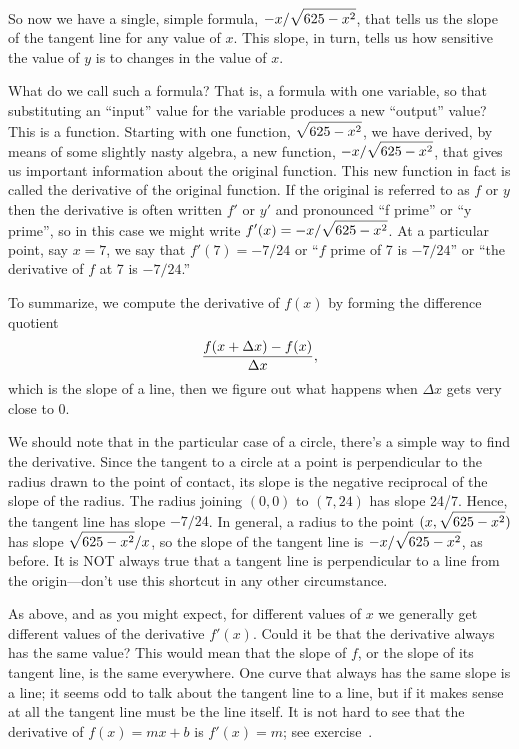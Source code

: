 So now we have a single, simple formula, $\displaystyle {-x/ \sqrt{625-x^2}}$,
that tells us the slope of the tangent line for any value of
$x$. This slope, in turn, tells us how sensitive the value of $y$ is
to changes in the value of $x$. 

What do we call such a formula? That is, a formula with one variable,
so that substituting an ``input'' value for the variable produces a
new ``output'' value? This is a function. Starting with one function,
$\displaystyle \sqrt{625-x^2}$, we have derived, by means of some slightly nasty
algebra, a new function, $\displaystyle {-x/ \sqrt{625-x^2}}$, that gives us
important information about the original function. This new function
in fact is called the {\dfont derivative} of the
original function. If the original is referred to as $f$ or $y$ then
the derivative is often written $f'$ or $y'$ and pronounced ``f
prime'' or ``y prime'', so in this case we might write $\displaystyle f'(x)=-x/
\sqrt{625-x^2}$. At a particular point, say $x=7$, we say that
$f'(7)=-7/24$ or ``$f$ prime of 7 is $-7/24$'' or ``the derivative of
$f$ at 7 is $-7/24$.''

To summarize, we compute the derivative of $f(x)$ by forming the
difference quotient
$$
{f(x+\Delta x)-f(x)\over \Delta x},
$$
which is the slope of a line, then we figure out what happens when
$\Delta x$ gets very close to 0. 


We should note that in 
the particular case of a circle, there's a simple way to find the
derivative.  Since the tangent to a circle at a point is perpendicular to
the radius drawn to the point of contact, its slope is the negative
reciprocal of the slope of the radius.  The radius joining $(0,0)$ to
$(7,24)$ has slope 24/7.  Hence, the tangent line has slope
$-7/24$. In general, a radius to the point $\displaystyle (x,\sqrt{625-x^2})$ has
slope $\displaystyle \sqrt{625-x^2}/x$, so the slope of the tangent line is
$\displaystyle {-x/ \sqrt{625-x^2}}$, as before. It is {\txtbold NOT} always true that a
tangent line is perpendicular to a line from the origin---don't use
this shortcut in any other circumstance. 

As above, and as you might expect, for different values of $x$ we
generally get different values of the derivative $f'(x)$. Could it be
that the derivative always has the same value? This would mean that
the slope of $f$, or the slope of its tangent line, is the same
everywhere. One curve that always has the same slope is a line; it
seems odd to talk about the tangent line to a line, but if it makes
sense at all the tangent line must be the line itself. It is not hard
to see that the derivative of $f(x)=mx+b$ is $f'(x)=m$; see
exercise~.

